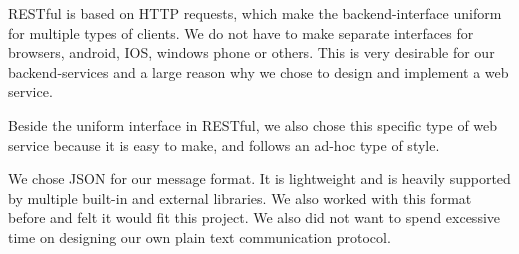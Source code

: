 RESTful is based on HTTP requests, which make the backend-interface uniform for multiple types of clients. We do not have to make separate interfaces for browsers, android, IOS, windows phone or others. This is very desirable for our backend-services and a large reason why we chose to design and implement a web service. 

Beside the uniform interface in RESTful, we also chose this specific type of web service because it is easy to make, and follows an ad-hoc type of style\cite{DecidingOnRESTful}. 

We chose JSON for our message format. It is lightweight and is heavily supported by multiple built-in and external libraries. We also worked with this format before and felt it would fit this project. We also did not want to spend excessive time on designing our own plain text communication protocol.